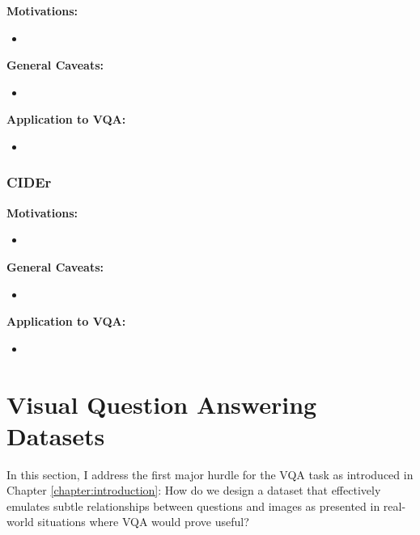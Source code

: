 \textbf{Motivations:}

\begin{itemize}
    \item 
\end{itemize}

\textbf{General Caveats:}

\begin{itemize}
    \item 
\end{itemize}

\textbf{Application to VQA:}
\begin{itemize}
    \item 
\end{itemize}

\subsubsection{CIDEr}

\textbf{Motivations:}

\begin{itemize}
    \item 
\end{itemize}

\textbf{General Caveats:}

\begin{itemize}
    \item 
\end{itemize}

\textbf{Application to VQA:}
\begin{itemize}
    \item 
\end{itemize}


\section{Visual Question Answering Datasets}
\label{section:vqa_datasets}

In this section, I address the first major hurdle for the VQA task as introduced in Chapter \ref{chapter:introduction}: How do we design a dataset that effectively emulates subtle relationships between questions and images as presented in real-world situations where VQA would prove useful?


